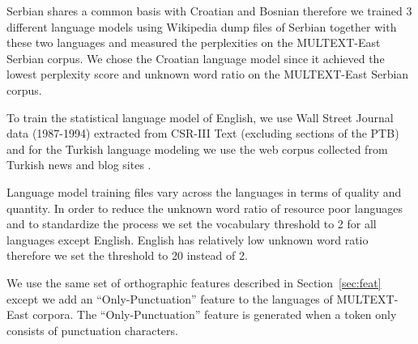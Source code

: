 Serbian shares a common basis with Croatian and Bosnian therefore we
trained 3 different language models using Wikipedia dump files of
Serbian together with these two languages and measured the
perplexities on the MULTEXT-East Serbian corpus.  We chose the
Croatian language model since it achieved the lowest perplexity score
and unknown word ratio on the MULTEXT-East Serbian corpus.

To train the statistical language model of English, we use Wall Street
Journal data (1987-1994) extracted from CSR-III Text \cite{csr3text}
(excluding sections of the PTB) and for the Turkish language modeling
we use the web corpus collected from Turkish news and blog sites
\cite{sak2008turkish}.

Language model training files vary across the languages in terms of
quality and quantity.  In order to reduce the unknown word ratio of
resource poor languages and to standardize the process we set the
vocabulary threshold to 2 for all languages except English.  English
has relatively low unknown word ratio therefore we set the threshold
to 20 instead of 2.

We use the same set of orthographic features described in
Section~\ref{sec:feat} except we add an ``Only-Punctuation'' feature
to the languages of MULTEXT-East corpora.  The ``Only-Punctuation''
feature is generated when a token only consists of punctuation
characters.

